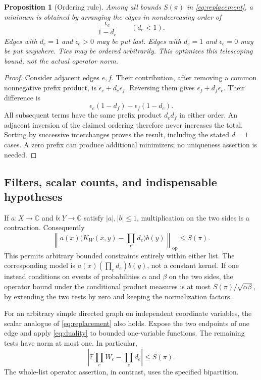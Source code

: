 \documentclass[11pt,a4paper]{article}
\numberwithin{equation}{section}
\newtheorem{proposition}[theorem]{Proposition}
\theoremstyle{definition}
\theoremstyle{remark}
\newcommand{\E}{\mathbb E}
\newcommand{\C}{\mathbb C}
\newcommand{\op}{\mathrm{op}}
\newcommand{\norm}[1]{\left\lVert #1\right\rVert}
\newcommand{\abs}[1]{\left\lvert #1\right\rvert}
\begin{document}
\begin{proposition}[Ordering rule]
\label{prop:order}
Among all bounds $S(\pi)$ in \eqref{eq:replacement}, a minimum is
obtained by arranging the edges in nondecreasing order of
\[
 \frac{\epsilon_e}{1-d_e}\qquad(d_e<1).
\]
Edges with $d_e=1$ and $\epsilon_e>0$ may be put last. Edges with
$d_e=1$ and $\epsilon_e=0$ may be put anywhere. Ties may be ordered
arbitrarily. This optimizes this telescoping bound, not the actual
operator norm.
\end{proposition}
\begin{proof}
Consider adjacent edges $e,f$. Their contribution, after removing a
common nonnegative prefix product, is
$\epsilon_e+d_e\epsilon_f$. Reversing them gives
$\epsilon_f+d_f\epsilon_e$. Their difference is
\[
 \epsilon_e(1-d_f)-\epsilon_f(1-d_e).
\]
All subsequent terms have the same prefix product $d_ed_f$ in either
order. An adjacent inversion of the claimed ordering therefore never
increases the total. Sorting by successive interchanges proves the result,
including the stated $d=1$ cases. A zero prefix can produce additional
minimizers; no uniqueness assertion is needed.
\end{proof}

\subsection{Filters, scalar counts, and indispensable hypotheses}

If $a:X\to\C$ and $b:Y\to\C$ satisfy $|a|,|b|\le1$, multiplication
on the two sides is a contraction. Consequently
\[
 \norm{a(x)\bigl(K_W(x,y)-\prod_e d_e\bigr)b(y)}_{\op}
 \le S(\pi).
\]
This permits arbitrary bounded constraints entirely within either list.
The corresponding model is $a(x)(\prod_e d_e)b(y)$, not a constant
kernel. If one instead conditions on events of probabilities $\alpha$
and $\beta$ on the two sides, the operator bound under the conditional
product measures is at most $S(\pi)/\sqrt{\alpha\beta}$, by extending
the two tests by zero and keeping the normalization factors.

For an arbitrary simple directed graph on independent coordinate
variables, the scalar analogue of \eqref{eq:replacement} also holds.
Expose the two endpoints of one edge and apply \eqref{eq:duality} to
bounded one-variable functions. The remaining tests have norm at most
one. In particular,
\begin{equation}
 \abs{\E\prod_eW_e-\prod_ed_e}\le S(\pi).
 \label{eq:scalar}
\end{equation}
The whole-list operator assertion, in contrast, uses the specified
bipartition.
\end{document}
